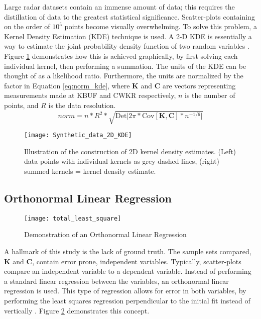 Large radar datasets contain an immense amount of data; this requires the distillation of data to the greatest statistical significance. Scatter-plots containing on the order of $10^5$ points become visually overwhelming. To solve this problem, a Kernel Density Estimation (KDE) technique is used. A 2-D KDE is essentially a way to estimate the joint probability density function of two random variables \citep{Silverman1986}. Figure \ref{fig:synthetic_KDE} demonstrates how this is achieved graphically, by first solving each individual kernel, then performing a summation. The units of the KDE can be thought of as a likelihood ratio. Furthermore, the units are normalized by the factor in Equation \ref{eq:norm_kde}, where \textbf{K} and \textbf{C} are vectors representing measurements made at KBUF and CWKR respectively, $n$ is the number of points, and $R$ is the data resolution.
\begin{equation}\label{eq:norm_kde}
norm = n * R^{2} * \sqrt{\mathrm{Det} \vert 2\pi * \mathrm{Cov}[\mathbf{K},\mathbf{C}] * n^{-1/6} \vert}
\end{equation}
\begin{figure}
\texttt{[image: Synthetic\_data\_2D\_KDE]}\centering
\caption{Illustration of the construction of 2D kernel density estimates. (Left) data points with individual kernels as grey dashed lines, (right) summed kernels = kernel density estimate.} 
\label{fig:synthetic_KDE}
\end{figure}

\subsection{Orthonormal Linear Regression}
\begin{figure}
\texttt{[image: total\_least\_square]}\centering
\caption{Demonstration of an Orthonormal Linear Regression} 
\label{fig:total_least_squares}
\end{figure}
A hallmark of this study is the lack of ground truth. The sample sets compared, \textbf{K} and \textbf{C}, contain error prone, independent variables. Typically, scatter-plots compare an independent variable to a dependent variable. Instead of performing a standard linear regression between the variables, an orthonormal linear regression is used. This type of regression allows for error in both variables, by performing the least squares regression perpendicular to the initial fit instead of vertically \citep{Markovsky2007}. Figure \ref{fig:total_least_squares} demonstrates this concept.

